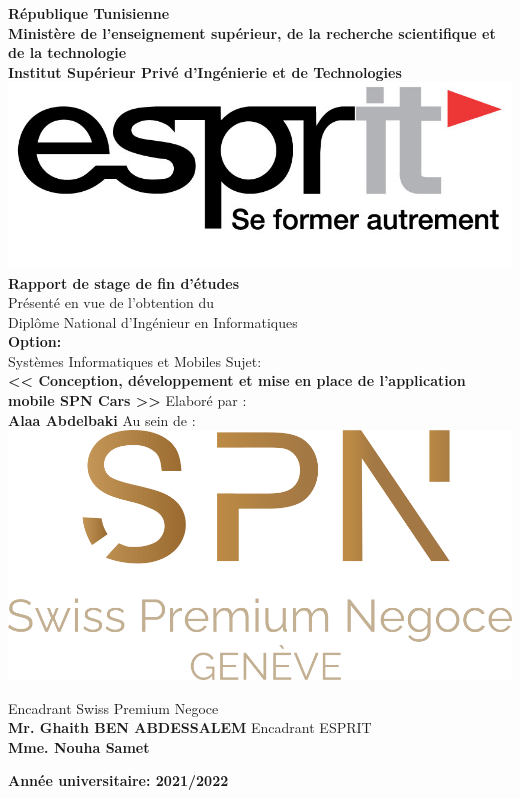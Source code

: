 \thispagestyle{empty}
\graphicspath{{./images/}}

\justifying
\centering

\centering
\textbf{{\footnotesize République Tunisienne}}\\
\textbf{{\footnotesize Ministère de l'enseignement supérieur, de la recherche scientifique et de la technologie}}\\
\textbf{{\footnotesize Institut Supérieur Privé d'Ingénierie et de Technologies}}\\
\bigbreak
\includegraphics[width=0.5\linewidth]{esprit.jpg} \\
\bigbreak
\textbf{{\huge Rapport de stage de fin d'études}} \\
\bigbreak
\bigbreak
\bigbreak
{\large Présenté en vue de l'obtention du} \\
\bigbreak
{\large Diplôme National d'Ingénieur en Informatiques} \\
\bigbreak
\textbf{{\large Option:}}\\
\bigbreak
{\large Systèmes Informatiques et Mobiles}
\bigbreak
\bigbreak
\bigbreak
{\large Sujet:}\\
\bigbreak
\textbf{{\Large << Conception, développement et mise en place de l'application mobile SPN Cars >>}}
\bigbreak
\bigbreak
\bigbreak
{\large Elaboré par :}\\
\bigbreak
\textbf{{\large Alaa Abdelbaki}}
\bigbreak
\bigbreak
{\large Au sein de :}
\bigbreak
\includegraphics[width=0.5\linewidth]{spn_logo.png}
\bigbreak
\begin{multicols}{2}
    Encadrant Swiss Premium Negoce\\ \textbf{Mr. Ghaith BEN ABDESSALEM}
    Encadrant ESPRIT\\ \textbf{Mme. Nouha Samet}
\end{multicols}
\vspace*{\fill}
\textbf{\footnotesize Année universitaire: 2021/2022}




